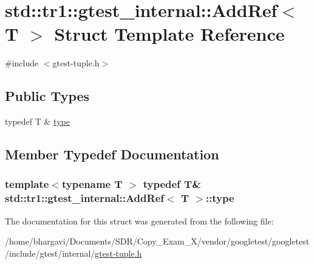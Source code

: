 \hypertarget{structstd_1_1tr1_1_1gtest__internal_1_1_add_ref}{}\section{std\+:\+:tr1\+:\+:gtest\+\_\+internal\+:\+:Add\+Ref$<$ T $>$ Struct Template Reference}
\label{structstd_1_1tr1_1_1gtest__internal_1_1_add_ref}


{\ttfamily \#include $<$gtest-\/tuple.\+h$>$}

\subsection*{Public Types}
\begin{DoxyCompactItemize}
\item 
typedef T \& \hyperlink{structstd_1_1tr1_1_1gtest__internal_1_1_add_ref_a1e5616e414125574c1653e3a1fc68491}{type}
\end{DoxyCompactItemize}


\subsection{Member Typedef Documentation}
\subsubsection[{\texorpdfstring{type}{type}}]{\setlength{\rightskip}{0pt plus 5cm}template$<$typename T $>$ typedef T\& {\bf std\+::tr1\+::gtest\+\_\+internal\+::\+Add\+Ref}$<$ T $>$\+::{\bf type}}\hypertarget{structstd_1_1tr1_1_1gtest__internal_1_1_add_ref_a1e5616e414125574c1653e3a1fc68491}{}\label{structstd_1_1tr1_1_1gtest__internal_1_1_add_ref_a1e5616e414125574c1653e3a1fc68491}


The documentation for this struct was generated from the following file\+:\begin{DoxyCompactItemize}
\item 
/home/bhargavi/\+Documents/\+S\+D\+R/\+Copy\+\_\+\+Exam\+\_\+X/vendor/googletest/googletest/include/gtest/internal/\hyperlink{gtest-tuple_8h}{gtest-\/tuple.\+h}\end{DoxyCompactItemize}
